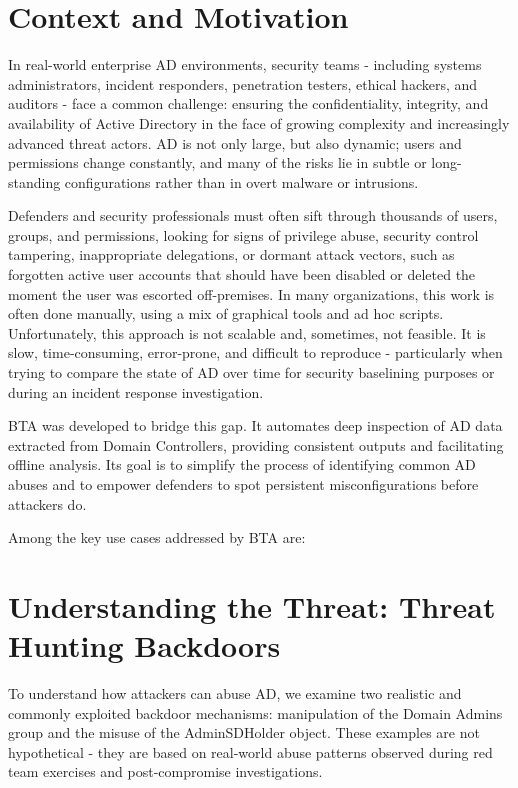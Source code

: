 \section{Context and Motivation}

In real-world enterprise AD environments, security teams - including systems administrators, incident responders, penetration testers, ethical hackers, and auditors - face a common challenge: ensuring the confidentiality, integrity, and availability of Active Directory in the face of growing complexity and increasingly advanced threat actors. AD is not only large, but also dynamic; users and permissions change constantly, and many of the risks lie in subtle or long-standing configurations rather than in overt malware or intrusions.

Defenders and security professionals must often sift through thousands of users, groups, and permissions, looking for signs of privilege abuse, security control tampering, inappropriate delegations, or dormant attack vectors, such as forgotten active user accounts that should have been disabled or deleted the moment the user was escorted off-premises. In many organizations, this work is often done manually, using a mix of graphical tools and ad hoc scripts. Unfortunately, this approach is not scalable and, sometimes, not feasible. It is slow, time-consuming, error-prone, and difficult to reproduce - particularly when trying to compare the state of AD over time for security baselining purposes or during an incident response investigation.

BTA was developed to bridge this gap. It automates deep inspection of AD data extracted from Domain Controllers, providing consistent outputs and facilitating offline analysis. Its goal is to simplify the process of identifying common AD abuses and to empower defenders to spot persistent misconfigurations before attackers do.

Among the key use cases addressed by BTA are:
    
\section{Understanding the Threat: Threat Hunting Backdoors}

To understand how attackers can abuse AD, we examine two realistic and commonly exploited backdoor mechanisms: manipulation of the Domain Admins group and the misuse of the AdminSDHolder
 object. These examples are not hypothetical - they are based on real-world abuse patterns observed during red team exercises and post-compromise investigations.

